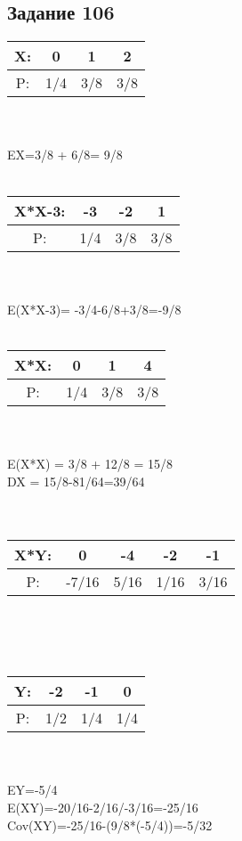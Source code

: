 \documentclass[12pt]{article}
\begin{document}
\subsection{Задание 106}
\begin{tabular}{|c|c|c|c|}
\hline
X: & 0 & 1 & 2 \\
\hline
P: & 1/4 & 3/8 & 3/8  \\
\hline
\end{tabular}
\\ 
\\
EX=3/8 + 6/8= 9/8\\
\\
\begin{tabular}{|c|c|c|c|}
\hline
X*X-3: & -3 & -2 & 1 \\
\hline
P: & 1/4 & 3/8 & 3/8  \\
\hline
\end{tabular}
\\ 
\\
E(X*X-3)= -3/4-6/8+3/8=-9/8\\
\\
\begin{tabular}{|c|c|c|c|}
\hline
X*X: & 0 & 1 & 4 \\
\hline
P: & 1/4 & 3/8 & 3/8  \\
\hline
\end{tabular}
\\ 
\\
E(X*X) = 3/8 + 12/8 = 15/8\\
DX = 15/8-81/64=39/64\\
\\
\\
\begin{tabular}{|c|c|c|c|c|}
\hline
X*Y: & 0 & -4 & -2& -1 \\
\hline
P: & -7/16 & 5/16 & 1/16 & 3/16  \\
\hline
\end{tabular}
\\ 
\\
\\
\begin{tabular}{|c|c|c|c|}
\hline
Y: & -2 & -1 & 0 \\
\hline
P: & 1/2 & 1/4 & 1/4  \\
\hline
\end{tabular}
\\ 
\\
EY=-5/4\\
E(XY)=-20/16-2/16/-3/16=-25/16\\
Cov(XY)=-25/16-(9/8*(-5/4))=-5/32\\
\newpage
\end{document}

